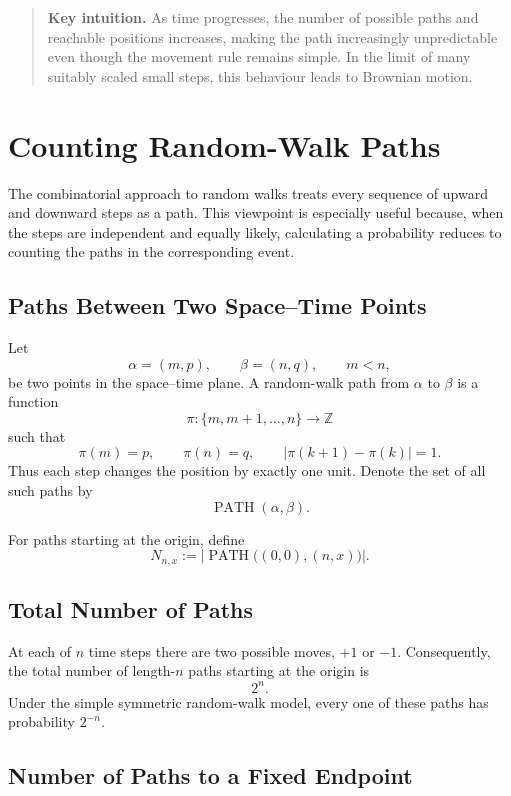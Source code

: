\documentclass[12pt,openany]{book}
\theoremstyle{definition}
\theoremstyle{remark}
\begin{document}
\begin{quote}
\colorbox{diagramOrange!12}{%
\parbox{\dimexpr\linewidth-2\fboxsep\relax}{%
\textbf{Key intuition.} As time progresses, the number of possible paths and
reachable positions increases, making the path increasingly unpredictable
even though the movement rule remains simple. In the limit of many suitably
scaled small steps, this behaviour leads to Brownian motion.}}
\end{quote}

\section{Counting Random-Walk Paths}

The combinatorial approach to random walks treats every sequence of upward
and downward steps as a path. This viewpoint is especially useful because,
when the steps are independent and equally likely, calculating a probability
reduces to counting the paths in the corresponding event.

\subsection{Paths Between Two Space--Time Points}

Let
\[
\alpha=(m,p),
\qquad
\beta=(n,q),
\qquad m<n,
\]
be two points in the space--time plane. A random-walk path from \(\alpha\) to
\(\beta\) is a function
\[
\pi:\{m,m+1,\ldots,n\}\longrightarrow\mathbb{Z}
\]
such that
\[
\pi(m)=p,
\qquad
\pi(n)=q,
\qquad
|\pi(k+1)-\pi(k)|=1.
\]
Thus each step changes the position by exactly one unit. Denote the set of
all such paths by
\[
\operatorname{PATH}(\alpha,\beta).
\]

For paths starting at the origin, define
\[
N_{n,x}
:=
\left|
\operatorname{PATH}\bigl((0,0),(n,x)\bigr)
\right|.
\]

\subsection{Total Number of Paths}

At each of \(n\) time steps there are two possible moves, \(+1\) or \(-1\).
Consequently, the total number of length-\(n\) paths starting at the origin is
\[
2^n.
\]
Under the simple symmetric random-walk model, every one of these paths has
probability \(2^{-n}\).

\subsection{Number of Paths to a Fixed Endpoint}
\end{document}
